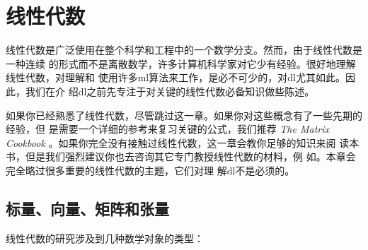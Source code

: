 \chapter{线性代数}
\label{ch:linear_algebra}

线性代数是广泛使用在整个科学和工程中的一个数学分支。然而，由于线性代数是一种连续
的形式而不是离散数学，许多计算机科学家对它少有经验。很好地理解线性代数，对理解和
使用许多\gls*{ml}算法来工作，是必不可少的，对\gls*{dl}尤其如此。因此，我们在介
绍\gls*{dl}之前先专注于对关键的线性代数必备知识做些陈述。

如果你已经熟悉了线性代数，尽管跳过这一章。如果你对这些概念有了一些先期的经验，但
是需要一个详细的参考来复习关键的公式，我们推荐 \emph{The Matrix Cookbook}
\citep{matrix-cookbook}。如果你完全没有接触过线性代数，这一章会教你足够的知识来阅
读本书，但是我们强烈建议你也去咨询其它专门教授线性代数的材料，例
如\citep{shilov1977linear}。本章会完全略过很多重要的线性代数的主题，它们对理
解\gls*{dl}不是必须的。

\section{标量、向量、矩阵和张量}
\label{scalars_vectors_matrices_and_tensors}

线性代数的研究涉及到几种数学对象的类型：

